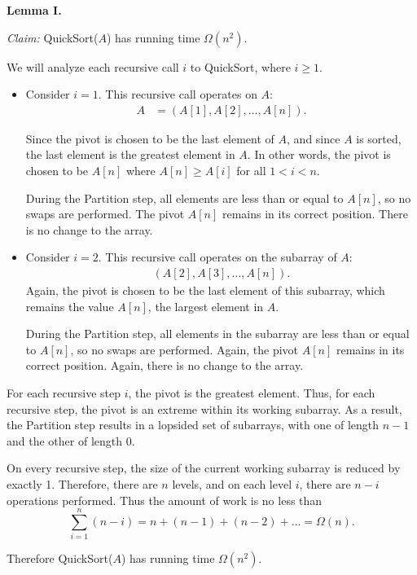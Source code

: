 \begin{enumerate}
\begin{solution}
\textbf{Lemma I. }

\textit{Claim: }{\sc QuickSort}($A$) has running time $\Omega(n^2)$.

We will analyze each recursive call $i$ to {\sc QuickSort}, where $i\geq 1$.
\begin{itemize}
\item Consider $i=1$. This recursive call operates on $A$:
\begin{align*}
A&=(A[1],A[2],\dots,A[n]).
\end{align*}

Since the pivot is chosen to be the last element of $A$, and since $A$ is sorted, the last element is the greatest element in $A$. In other words, the pivot is chosen to be $A[n]$ where $A[n]\geq A[i]$ for all $1<i<n$.

During the {\sc Partition} step, all elements are less than or equal to $A[n]$, so no swaps are performed. The pivot $A[n]$ remains in its correct position. There is no change to the array.

\item Consider $i=2$. This recursive call operates on the subarray of $A$:
\begin{align*}
(A[2],A[3],\dots,A[n]).
\end{align*}
Again, the pivot is chosen to be the last element of this subarray, which remains the value $A[n]$, the largest element in $A$.

During the {\sc Partition} step, all elements in the subarray are less than or equal to $A[n]$, so no swaps are performed. Again, the pivot $A[n]$ remains in its correct position. Again, there is no change to the array.
\end{itemize}

For each recursive step $i$, the pivot is the greatest element. Thus, for each recursive step, the pivot is an extreme within its working subarray. As a result, the {\sc Partition} step results in a lopsided set of subarrays, with one of length $n-1$ and the other of length $0$.

On every recursive step, the size of the current working subarray is reduced by exactly 1. Therefore, there are $n$ levels, and on each level $i$, there are $n-i$ operations performed. Thus the amount of work is no less than
\begin{equation*}
\sum_{i=1}^n(n-i)=n+(n-1)+(n-2)+\dots=\Omega(n).
\end{equation*}

Therefore {\sc QuickSort}($A$) has running time $\Omega(n^2)$.\\


\end{solution}
\end{enumerate}
